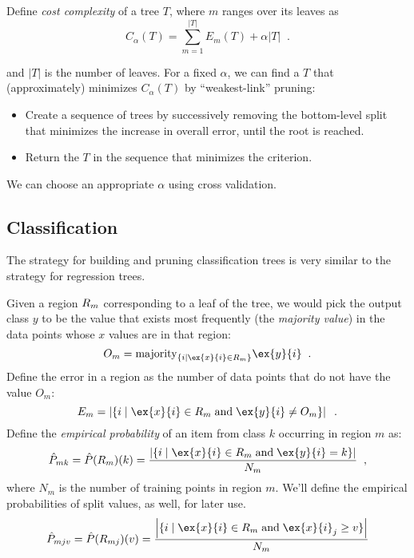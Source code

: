 Define {\em cost complexity} of a tree $T$, where $m$ ranges over its
leaves as 
\begin{equation}
C_\alpha(T) = \sum_{m = 1}^{|T|} E_m(T) + \alpha |T|\;\;.
\end{equation}

\noindent
and $|T|$ is the number of leaves.
For a fixed $\alpha$, we can find a $T$ that (approximately) minimizes
$C_\alpha(T)$ by ``weakest-link'' pruning:
\begin{itemize}
\item Create a sequence of trees by successively removing the
  bottom-level split that minimizes the increase in overall error,
  until the root is reached.
\item Return the $T$ in the sequence that minimizes the criterion.
\end{itemize}
We can choose an appropriate $\alpha$ using cross validation.

\subsection{Classification}

The strategy for building and pruning classification trees is very
similar to the strategy for regression trees.  

Given a region $R_m$ corresponding to a leaf of the tree, we would
pick the output class $y$ to be the value that exists most frequently
(the {\em majority value}) in the data points whose $x$ values are in
that region:
\[O_m = {\rm majority}_{\{i \mid \ex{x}{i} \in \Rfeat_m\}}\ex{y}{i}\;\;.\]
Define the error in a region as the number of data points that do not
have the value $O_m$:
\[E_m = \left|\{i \mid \ex{x}{i} \in \Rfeat_m \;\text{and}\; \ex{y}{i} \not
  = O_m\}\right|\;\;.\]
Define the {\em empirical probability} of an item from class $k$
occurring in region $m$ as:
\[\hat{P}_{mk} = \hat{P}(\Rfeat_m)(k) = \frac{\left|\{i \mid \ex{x}{i} \in
    \Rfeat_m \;\text{and}\; \ex{y}{i} = k\}\right|}{N_m}\;\;,\]
where $N_m$ is the number of training points in region $m$.
We'll define the empirical probabilities of split values, as well,
for later use.
\[\hat{P}_{mjv} = \hat{P}(\Rfeat_{mj})(v) = \frac{\left|\{i \mid \ex{x}{i} \in
    \Rfeat_m \;\text{and}\; \ex{x}{i}_j \geq v\}\right|}{N_m}\]

